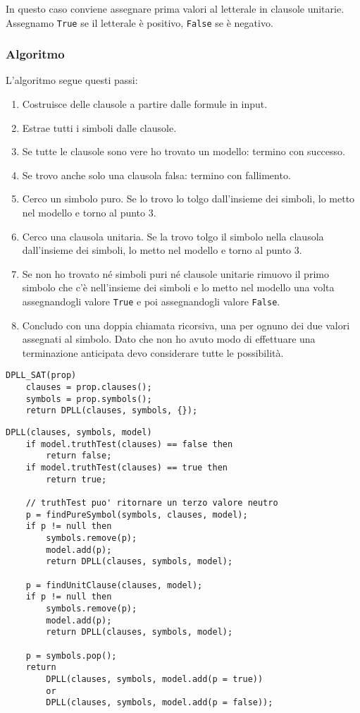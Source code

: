 In questo caso conviene assegnare prima valori al letterale in clausole unitarie. Assegnamo \verb|True| se il letterale \`e
positivo, \verb|False| se \`e negativo.

\subsubsection{Algoritmo}
L'algoritmo segue questi passi:
\begin{enumerate}
	\item Costruisce delle clausole a partire dalle formule in input.
	\item Estrae tutti i simboli dalle clausole.
	\item Se tutte le clausole sono vere ho trovato un modello: termino con successo.
	\item Se trovo anche solo una clausola falsa: termino con fallimento.
	\item Cerco un simbolo puro. Se lo trovo lo tolgo dall'insieme dei simboli, lo metto nel modello e torno al punto 3.
	\item Cerco una clausola unitaria. Se la trovo tolgo il simbolo nella clausola dall'insieme dei simboli,
	      lo metto nel modello e torno al punto 3.
	\item Se non ho trovato n\'e simboli puri n\'e clausole unitarie rimuovo il primo simbolo che c'\`e nell'insieme dei simboli
	      e lo metto nel modello una volta assegnandogli valore \verb|True| e poi assegnandogli valore \verb|False|.
	\item Concludo con una doppia chiamata ricorsiva, una per ognuno dei due valori assegnati al simbolo. Dato che non ho avuto modo
	      di effettuare una terminazione anticipata devo considerare tutte le possibilit\`a.
\end{enumerate}

\begin{lstlisting}[style=pseudo-style]
DPLL_SAT(prop)
	clauses = prop.clauses();
	symbols = prop.symbols();
	return DPLL(clauses, symbols, {});
\end{lstlisting}

\begin{lstlisting}[style=pseudo-style]
DPLL(clauses, symbols, model)
	if model.truthTest(clauses) == false then
		return false;
	if model.truthTest(clauses) == true then
		return true;
	
	// truthTest puo' ritornare un terzo valore neutro
	p = findPureSymbol(symbols, clauses, model);
	if p != null then 
		symbols.remove(p);
		model.add(p);
		return DPLL(clauses, symbols, model);
	
	p = findUnitClause(clauses, model);
	if p != null then
		symbols.remove(p);
		model.add(p);
		return DPLL(clauses, symbols, model);
	
	p = symbols.pop();
	return
		DPLL(clauses, symbols, model.add(p = true))
		or
		DPLL(clauses, symbols, model.add(p = false));
\end{lstlisting}

